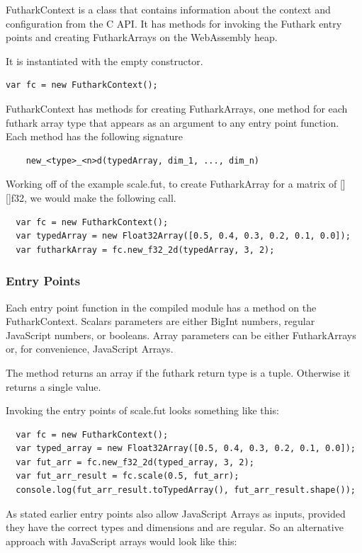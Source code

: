 \documentclass[11pt]{book}
\begin{document}
FutharkContext is a class that contains information about the context and configuration from the C API. It has methods for invoking the Futhark entry points and creating FutharkArrays on the WebAssembly heap. 

It is instantiated with the empty constructor.

\begin{verbatim}
var fc = new FutharkContext();
\end{verbatim}
 
FutharkContext has methods for creating FutharkArrays, one method for each futhark array type that appears as an argument to any entry point function. Each method has the following signature
\begin{verbatim}
    new_<type>_<n>d(typedArray, dim_1, ..., dim_n) 
\end{verbatim}

Working off of the example scale.fut, to create FutharkArray for a matrix of [][]f32, we would make the following call. 

\begin{verbatim}
  var fc = new FutharkContext();
  var typedArray = new Float32Array([0.5, 0.4, 0.3, 0.2, 0.1, 0.0]);
  var futharkArray = fc.new_f32_2d(typedArray, 3, 2);
\end{verbatim}

\subsubsection*{Entry Points}
Each entry point function in the compiled module has a method on the FutharkContext. Scalars parameters are either BigInt numbers, regular JavaScript numbers, or booleans. Array parameters can be either FutharkArrays or, for convenience, JavaScript Arrays.

The method returns an array if the futhark return type is a tuple. Otherwise it returns a single value.

Invoking the entry points of scale.fut looks something like this:

\begin{verbatim}
  var fc = new FutharkContext();
  var typed_array = new Float32Array([0.5, 0.4, 0.3, 0.2, 0.1, 0.0]);
  var fut_arr = fc.new_f32_2d(typed_array, 3, 2);
  var fut_arr_result = fc.scale(0.5, fut_arr);
  console.log(fut_arr_result.toTypedArray(), fut_arr_result.shape());
\end{verbatim}

As stated earlier entry points also allow JavaScript Arrays as inputs, provided they have the correct types and dimensions and are regular. So an alternative approach with JavaScript arrays would look like this:
\end{document}
